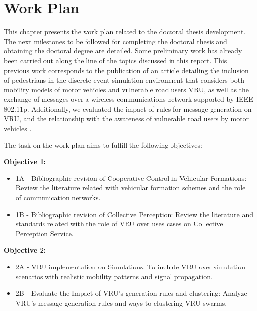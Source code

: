 \chapter{Work Plan}

This chapter presents the work plan related to the doctoral thesis development. The next milestones to be followed for completing the doctoral thesis and obtaining the doctoral degree are detailed. Some preliminary work has already been carried out along the line of the topics discussed in this report. This previous work corresponds to the publication of an article \cite{Yanez2020} detailing the inclusion of pedestrians in the discrete event simulation environment that considers both mobility models of motor vehicles and vulnerable road users VRU, as well as the exchange of messages over a wireless communications network supported by IEEE 802.11p. Additionally, we evaluated the impact of rules for message generation on VRU, and the relationship with the awareness of vulnerable road users by motor vehicles \cite{Lara2021}.

The task on the work plan aims to fulfill the following objectives:

\hspace{0.5cm}

\textbf{Objective 1:}
\begin{itemize}
    \item 1A - Bibliographic revision of Cooperative Control in Vehicular Formations: Review the literature related with vehicular formation schemes and the role of communication networks.
\item 1B - Bibliographic revision of Collective Perception: Review the literature and standards related with the role of VRU over uses cases on Collective Perception Service.
\end{itemize}

\hspace{0.5cm}

\textbf{Objective 2:}
\begin{itemize}
\item 2A - VRU implementation on Simulations: To include VRU over simulation scenarios with realistic mobility patterns and signal propagation.
\item 2B - Evaluate the Impact of VRU's generation rules and clustering: Analyze VRU's message generation rules and ways to clustering VRU swarms.  
\end{itemize}

